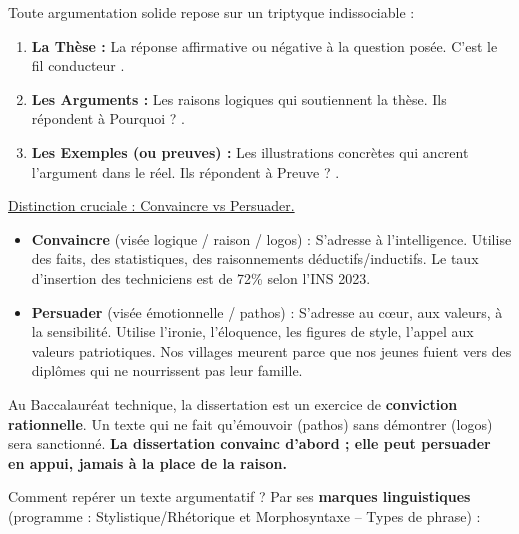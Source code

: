 \documentclass[11pt]{article}
\newcommand{\cle}[1]{{\popxbold\color{popdark}#1}}
\begin{document}
\begin{propriete}
Toute argumentation solide repose sur un triptyque indissociable :
\begin{enumerate}
    \item \textbf{La Thèse :} La réponse affirmative ou négative à la question posée. C'est le \og fil conducteur \fg{}.
    \item \textbf{Les Arguments :} Les raisons logiques qui soutiennent la thèse. Ils répondent à \og Pourquoi ? \fg{}.
    \item \textbf{Les Exemples (ou preuves) :} Les illustrations concrètes qui ancrent l'argument dans le réel. Ils répondent à \og Preuve ? \fg{}.
\end{enumerate}
\end{propriete}

\medskip
\noindent\underline{Distinction cruciale : Convaincre vs Persuader.}
\begin{itemize}
    \item \textbf{Convaincre} (visée \cle{logique} / \cle{raison} / \cle{logos}) : S'adresse à l'intelligence. Utilise des faits, des statistiques, des raisonnements déductifs/inductifs. \og Le taux d'insertion des techniciens est de 72\% selon l'INS 2023. \fg{}
    \item \textbf{Persuader} (visée \cle{émotionnelle} / \cle{pathos}) : S'adresse au cœur, aux valeurs, à la sensibilité. Utilise l'ironie, l'éloquence, les figures de style, l'appel aux valeurs patriotiques. \og Nos villages meurent parce que nos jeunes fuient vers des diplômes qui ne nourrissent pas leur famille. \fg{}
\end{itemize}

\begin{attention}
Au Baccalauréat technique, la dissertation est un exercice de \textbf{conviction rationnelle}. Un texte qui ne fait qu'émouvoir (pathos) sans démontrer (logos) sera sanctionné. \textbf{La dissertation convainc d'abord ; elle peut persuader en appui, jamais à la place de la raison.}
\end{attention}

\medskip
\noindent Comment repérer un texte argumentatif ? Par ses \textbf{marques linguistiques} (programme : Stylistique/Rhétorique et Morphosyntaxe -- Types de phrase) :
\end{document}

